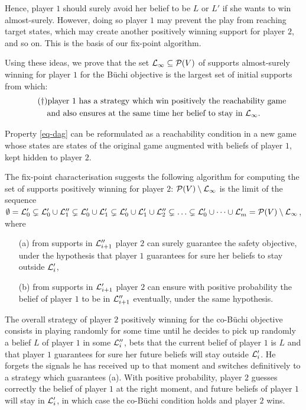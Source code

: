 Hence, player $1$ should surely avoid her belief to be $L$
or $L'$ if she wants to win almost-surely.
However, doing so player $1$ may prevent the play from
reaching target states, which may create another positively winning
support for player $2$, and so on. This is the basis of our fix-point algorithm.

Using these ideas, we prove that the set
$\mathcal{L}_\infty\subseteq \mathcal{P}(V)$ of supports almost-surely
winning for player $1$ for the B{\"u}chi objective is the largest set of
initial supports from which:
\begin{multline}
\label{eq-dag}
\tag{$\dag$}
\textrm{player $1$ has a strategy
  which win positively the reachability game}\\
\textrm{and also ensures at the same time
  her belief to stay in } \mathcal{L}_\infty .
\end{multline}

Property \eqref{eq-dag} can be reformulated as a reachability
condition in a new game whose states are states of the original game
augmented with beliefs of player $1$, kept hidden to player $2$.

The fix-point characterisation suggests the following algorithm for
computing the set of supports positively winning for player $2$:
$\mathcal{P}(V)\setminus\mathcal{L}_\infty$ is the limit of the sequence
$\emptyset=\mathcal{L}_0'\subsetneq \mathcal{L}_0'\cup \mathcal{L}_1''\subsetneq\mathcal{L}_0'\cup
\mathcal{L}_1'\subsetneq \mathcal{L}_0'\cup \mathcal{L}_1'\cup \mathcal{L}_2''\subsetneq\ldots
\subsetneq \mathcal{L}_0'\cup \cdots \cup \mathcal{L}'_m
=\mathcal{P}(V)\setminus\mathcal{L}_\infty$, where
\begin{itemize}
\item[(a)]
from supports in $\mathcal{L}''_{i+1}$ player $2$ can surely guarantee the safety objective,
under the hypothesis that player $1$ 
{guarantees for sure} her beliefs to stay outside $\mathcal{L}'_i$,
\item[(b)]
from supports in $\mathcal{L}'_{i+1}$ player $2$ can ensure with positive probability the belief of player
$1$ to be in $\mathcal{L}''_{i+1}$ eventually,
under the same hypothesis.
\end{itemize}

The overall strategy of player $2$ positively winning for the co-B{\"u}chi objective
consists in playing randomly for some time until he decides to pick
up randomly a belief $L$ of player $1$ in some $\mathcal{L}''_i$,
bets that the current belief of player $1$ is $L$ and that player $1$
guarantees for sure
her future beliefs 
will stay outside $\mathcal{L}'_i$.
He forgets
the signals he has received up to that moment and switches
definitively to a strategy which guarantees (a).  With positive
probability, player $2$ %
guesses correctly the belief of player $1$ at the right moment, and
future beliefs of player $1$ will stay in $\mathcal{L}'_i$, in which case the
co-B{\"u}chi condition holds and player $2$ wins.

